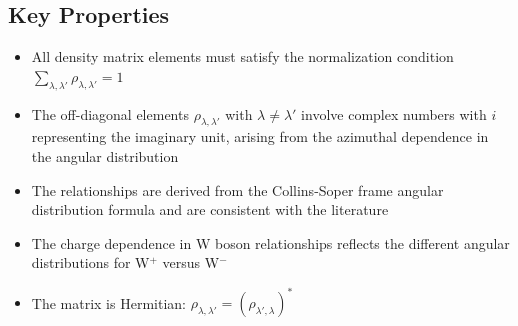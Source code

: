 \documentclass[11pt]{article}
\begin{document}
\subsection{Key Properties}

\begin{itemize}
    \item All density matrix elements must satisfy the normalization condition $\sum_{\lambda,\lambda'} \rho_{\lambda,\lambda'} = 1$
    \item The off-diagonal elements $\rho_{\lambda,\lambda'}$ with $\lambda \neq \lambda'$ involve complex numbers with $i$ representing the imaginary unit, arising from the azimuthal dependence in the angular distribution
    \item The relationships are derived from the Collins-Soper frame angular distribution formula and are consistent with the literature~\cite{CMS:2015cyj,ATLAS:2016rnf}
    \item The charge dependence in W boson relationships reflects the different angular distributions for W$^+$ versus W$^-$
    \item The matrix is Hermitian: $\rho_{\lambda,\lambda'} = (\rho_{\lambda',\lambda})^*$
\end{itemize}

\printbibliography %
\end{document}
